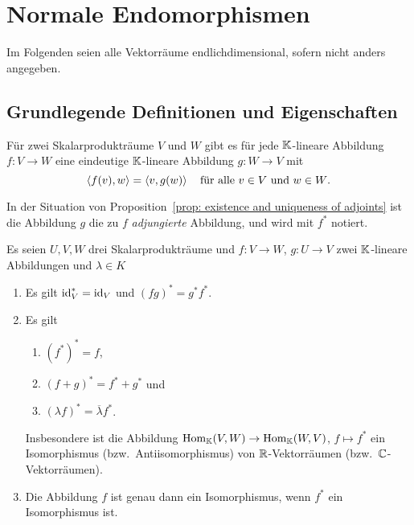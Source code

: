 \section{Normale Endomorphismen}


Im Folgenden seien alle Vektorräume endlichdimensional, sofern nicht anders angegeben.










\subsection{Grundlegende Definitionen und Eigenschaften}


\begin{proposition}\label{prop: existence and uniqueness of adjoints}
  Für zwei Skalarprodukträume $V$ und $W$ gibt es für jede $\mathbb{K}$-lineare Abbildung $f \colon V \to W$ eine eindeutige $\mathbb{K}$-lineare Abbildung $g \colon W \to V$ mit
  \[
    \left\langle f(v), w \right\rangle = \left\langle v, g(w) \right\rangle
    \quad
    \text{für alle $v \in V$ und $w \in W$}.
  \]
\end{proposition}


\begin{definition}
  In der Situation von Proposition~\ref{prop: existence and uniqueness of adjoints} ist die Abbildung $g$ die zu $f$ \emph{adjungierte} Abbildung, und wird mit $f^*$ notiert.
\end{definition}


\begin{proposition}
  Es seien $U, V, W$ drei Skalarprodukträume und $f \colon V \to W$, $g \colon U \to V$ zwei $\mathbb{K}$-lineare Abbildungen und $\lambda \in K$
  \begin{enumerate}[leftmargin=*, label=\roman*)]
    \item
      Es gilt $\operatorname{id}_V^* = \operatorname{id}_V$ und $(fg)^* = g^* f^*$.
    \item
      Es gilt
      \begin{enumerate}[leftmargin=*, label=\alph*)]
        \item
          $(f^*)^* = f$,
        \item
          $(f + g)^* = f^* + g^*$ und
        \item
          $(\lambda f)^* = \overline{\lambda} f^*$.
      \end{enumerate}
      Insbesondere ist die Abbildung $\operatorname{Hom}_{\mathbb{K}}(V,W) \to \operatorname{Hom}_{\mathbb{K}}(W,V)$, $f \mapsto f^*$ ein Isomorphismus (bzw.\ Antiisomorphismus) von $\mathbb{R}$-Vektorräumen (bzw.\ $\mathbb{C}$-Vektorräumen).
    \item
      Die Abbildung $f$ ist genau dann ein Isomorphismus, wenn $f^*$ ein Isomorphismus ist.
  \end{enumerate}
\end{proposition}


